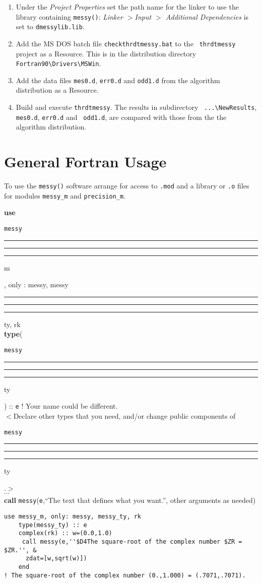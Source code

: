\documentclass[12pt]{article}
\DeclareRobustCommand{\us}{\rule{.2pt}{0pt}\rule[-.8pt]{.4em}{.5pt}%
  \rule{.2pt}{0pt}}
\DeclareRobustCommand{\us}{\rule{.2pt}{0pt}\rule[-.8pt]{.4em}{.5pt}%
  \rule{.2pt}{0pt}}
\begin{document}
\begin{description}
\begin{enumerate}
  \item Under the {\em Project Properties} set the path name for the linker to
    use the library containing {\tt messy()}: {\em Linker $>$Input $>$
      Additional Dependencies} is set to {\tt dmessylib.lib}.
  \item Add the MS DOS batch file {\tt checkthrdtmessy.bat} to the {\tt
      thrdtmessy} project as a Resource.  This is in the distribution directory
    {\tt Fortran90\textbackslash Drivers\textbackslash MSWin}.
  \item Add the data files {\tt mes0.d}, {\tt err0.d} and {\tt odd1.d} from the
    algorithm distribution as a Resource.
  \item Build and execute {\tt thrdtmessy}.  The results in subdirectory {\tt
      ...\textbackslash NewResults}, {\tt mes0.d}, {\tt err0.d} and {\tt
      odd1.d}, are compared with those from the the algorithm distribution.
  \end{enumerate}
\end{description}

\section{General Fortran Usage}

To use the {\tt messy()} software arrange for access to {\tt.mod} and a library
or {\tt .o} files for modules {\tt messy\_m} and {\tt precision\_m}.
\begin{tabbing}
  {\bf use} {\tt messy\us m}, only : messy, messy\us ty, rk\\
  {\bf type}({\tt messy\us ty}) :: {\tt e} ! Your name could be different.\\
  $<$Declare other types that you need, and/or change public components of
  {\tt messy\us ty}.$>$\\
  $\cdots$\\
  {\bf call} {\tt messy}({\tt e},``The text that defines what you
  want.'', other arguments as needed)
\end{tabbing}\vspace{-15pt}
\begin{lstlisting}[frame=single, caption={Sample use of {\tt messy()} to print
four digits of two complex numbers}]
use messy_m, only: messy, messy_ty, rk
    type(messy_ty) :: e
    complex(rk) :: w=(0.0,1.0)
     call messy(e,''$D4The square-root of the complex number $ZR = $ZR.'', &
      zdat=[w,sqrt(w)])
    end
! The square-root of the complex number (0.,1.000) = (.7071,.7071).
\end{lstlisting}
\end{document}
